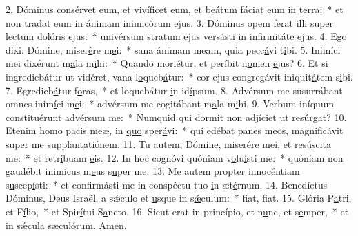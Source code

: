 2. Dóminus consérvet eum, et vivíficet eum, et beátum fáciat \uline{e}um in t\uline{e}rra:~* et non tradat eum in ánimam inimic\uline{ó}rum \uline{e}jus.
3. Dóminus opem ferat illi super lectum dol\uline{ó}ris \uline{e}jus:~* univérsum stratum ejus versásti in infirmit\uline{á}te \uline{e}jus.
4. Ego dixi: Dómine, miser\uline{é}re m\uline{e}i:~* sana ánimam meam, quia pecc\uline{á}vi t\uline{i}bi.
5. Inimíci mei dixérunt m\uline{a}la m\uline{i}hi:~* Quando moriétur, et períbit n\uline{o}men \uline{e}jus?
6. Et si ingrediebátur ut vidéret, vana l\uline{o}queb\uline{á}tur:~* cor ejus congregávit iniquit\uline{á}tem s\uline{i}bi.
7. Egredieb\uline{á}tur f\uline{o}ras,~* et loquebátur \uline{i}n id\uline{í}psum.
8. Advérsum me susurrábant omnes inim\uline{í}ci m\uline{e}i:~* advérsum me cogitábant m\uline{a}la m\uline{i}hi.
9. Verbum iníquum constitu\uline{é}runt adv\uline{é}rsum me:~* Numquid qui dormit non adjíciet \uline{u}t res\uline{ú}rgat?
10. Etenim homo pacis meæ, in \uline{quo} sper\uline{á}vi:~* qui edébat panes meos, magnificávit super me supplant\uline{a}ti\uline{ó}nem.
11. Tu autem, Dómine, miserére mei, et res\uline{ú}scit\uline{a} me:~* et retr\uline{í}buam \uline{e}is.
12. In hoc cognóvi quóniam v\uline{o}lu\uline{í}sti me:~* quóniam non gaudébit inimícus m\uline{e}us s\uline{u}per me.
13. Me autem propter innocéntiam s\uline{u}scep\uline{í}sti:~* et confirmásti me in conspéctu tuo \uline{i}n æt\uline{é}rnum.
14. Benedíctus Dóminus, Deus Israël, a sǽculo et \uline{u}sque in s\uline{ǽ}culum:~* f\uline{i}at, f\uline{i}at.
15. Glória P\uline{a}tri, et F\uline{í}lio,~* et Spir\uline{í}tui S\uline{a}ncto.
16. Sicut erat in princípio, et n\uline{u}nc, et s\uline{e}mper,~* et in sǽcula sæcul\uline{ó}rum. \uline{A}men.
